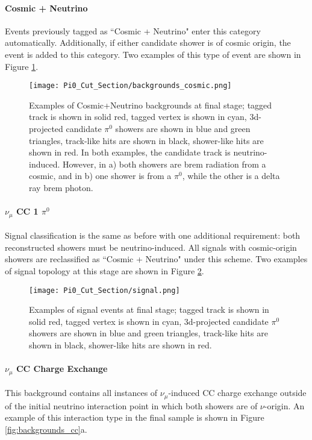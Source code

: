 \paragraph{ Cosmic + Neutrino}
Events previously tagged as ``Cosmic + Neutrino" enter this category automatically. Additionally, if either candidate shower is of cosmic origin, the event is added to this category. Two examples of this type of event are shown in Figure \ref{fig:backgrounds_cos}.

\begin{figure}[H]
\centering
\texttt{[image: Pi0\_Cut\_Section/backgrounds\_cosmic.png]}
\caption{ Examples of Cosmic+Neutrino backgrounds at final stage; tagged track is shown in solid red, tagged vertex is shown in cyan, 3d-projected candidate $\pi^0$ showers are shown in blue and green triangles, track-like hits are shown in black, shower-like hits are shown in red. In both examples, the candidate track is neutrino-induced. However, in a) both showers are brem radiation from a cosmic, and in b) one shower is from a $\pi^0$, while the other is a delta ray brem photon.}
\label{fig:backgrounds_cos}
\end{figure}

\paragraph{ $\nu_\mu$ CC 1 $\pi^0$ } Signal classification is the same as before with one additional requirement: both reconstructed showers must be neutrino-induced.  All signals with cosmic-origin showers are reclassified as ``Cosmic + Neutrino" under this scheme.  Two examples of signal topology at this stage are shown in Figure \ref{fig:backgrounds_signal}.

\begin{figure}[H]
\centering
\texttt{[image: Pi0\_Cut\_Section/signal.png]}
\caption{ Examples of signal events at final stage; tagged track is shown in solid red, tagged vertex is shown in cyan, 3d-projected candidate $\pi^0$ showers are shown in blue and green triangles, track-like hits are shown in black, shower-like hits are shown in red.}
\label{fig:backgrounds_signal}
\end{figure}

\paragraph{$\nu_\mu$ CC Charge Exchange}
This background contains all instances of $\nu_\mu$-induced CC charge exchange outside of the initial neutrino interaction point in which both showers are of $\nu$-origin. An example of this interaction type in the final sample is shown in Figure \ref{fig:backgrounds_cc}a. 

